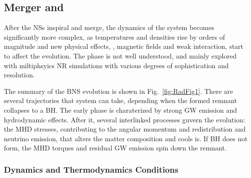 
\subsection{Merger and \pmerg{}}

After the \acp{NS} inspiral and merge, the dynamics of the system becomes significantly 
more complex, as temperatures and densities rise by orders of magnitude and new 
physical effects, \eg, magnetic fields and weak interaction, start to affect the evolution. 
The \pmerg{} phase is not well understood, and mainly explored with miltiphsyics \ac{NR} 
simulations with various degrees of sophistication and resolution. 

The summary of the \ac{BNS} \pmerg{} evolution is shown in Fig.~\ref{fig:RadFig1}. 
There are several trajectories that system can take, depending when the formed remnant 
collapses to a \ac{BH}. The early \pmerg{} phase is charaterized by strong \ac{GW} 
emission and hydrodynamic effects. After it, several interlinked processes guvern the 
evolution: the \ac{MHD} stresses, contributing to the angular momentum and redistribution 
and neutrino emission, that alters the matter composition and cools is.
If \ac{BH} does not form, the \ac{MHD} torques and residual \ac{GW} emission spin down 
the remnant.

\subsubsection{Dynamics and Thermodynamics Conditions}

